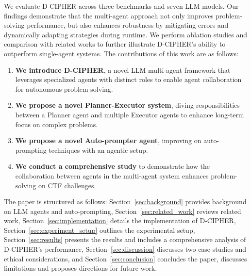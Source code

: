 We evaluate D-CIPHER across three benchmarks and seven LLM models. Our findings demonstrate that the multi-agent approach not only improves problem-solving performance, but also enhances robustness by mitigating errors and dynamically adapting strategies during runtime. We perform ablation studies and comparison with related works to further illustrate D-CIPHER's ability to outperform single-agent systems. The contributions of this work are as follows: 
\begin{enumerate}[leftmargin=2em]
    \item \textbf{We introduce D-CIPHER}, a novel LLM multi-agent framework that leverages specialized agents with distinct roles to enable agent collaboration for autonomous problem-solving.
    \item \textbf{We propose a novel Planner-Executor system}, diving responsibilities between a Planner agent and multiple Executor agents to enhance long-term focus on complex problems. 
    \item \textbf{We propose a novel Auto-prompter agent}, improving on auto-prompting techniques with an agentic setup.
    \item \textbf{We conduct a comprehensive study} to demonstrate how the collaboration between agents in the multi-agent system enhances problem-solving on CTF challenges.
\end{enumerate}




The paper is structured as follows: 
Section~\ref{sec:background} provides background on LLM agents and auto-prompting, Section~\ref{sec:related_work} reviews related work, Section~\ref{sec:implementation} details the implementation of D-CIPHER, Section~\ref{sec:experiment_setup} outlines the experimental setup, Section~\ref{sec:results} presents the results and includes a comprehensive analysis of D-CIPHER's performance, Section~\ref{sec:discussion} discusses two case studies and ethical considerations, and Section~\ref{sec:conclusion} concludes the paper, discusses limitations and proposes directions for future work.
